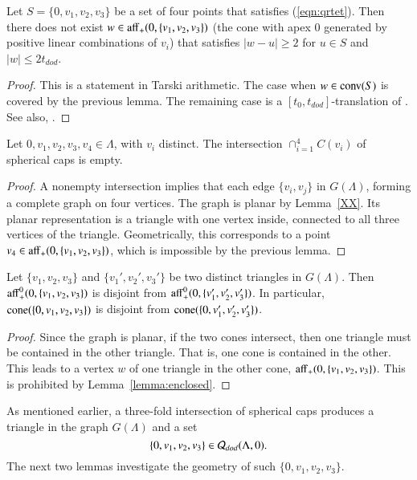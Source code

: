 \begin{lemma}\label{lemma:enclosed} 
Let $S=\{0,v_1,v_2,v_3\}$ be a set of four points
that satisfies (\ref{eqn:qrtet}).  Then
there does not exist $w\in{\operatorname{aff}}_+(0,\{v_1,v_2,v_3\})$
(the cone with apex $0$ 
generated by positive linear combinations of $v_i$) 
that satisfies $|w-u|\ge 2$ for 
$u\in S$ and $|w|\le 2t_{dod}$.
\end{lemma}

\begin{proof} This is a statement in Tarski arithmetic.
The case when $w\in{\operatorname{conv}}(S)$ is covered by the previous lemma.
The remaining case is a $[t_0,t_{dod}]$-translation of
\cite[Lemma~4.19]{DCG}.  See also,  \cite[Cor~3.7]{arx}.
\end{proof}

\begin{lemma}  Let $0,v_1,v_2,v_3,v_4\in\Lambda$, with
$v_i$ distinct.  The intersection $\cap_{i=1}^4 C(v_i)$
of spherical caps is empty.
\end{lemma}

\begin{proof}  A nonempty intersection implies that each
edge $\{v_i,v_j\}$ in  $G(\Lambda)$, forming a complete graph
on four vertices.  The graph is planar by Lemma~\ref{XX}.
Its planar representation is a triangle with one vertex inside,
connected to all three vertices of the triangle.
Geometrically, this corresponds to a point $v_4\in{\operatorname{aff}}_+(0,\{v_1,v_2,v_3\})$, which is impossible by the previous lemma.
\end{proof}

\begin{lemma}  Let $\{v_1,v_2,v_3\}$ and $\{v_1',v_2',v_3'\}$
be two distinct triangles in $G(\Lambda)$.  Then
${\operatorname{aff}}_+^0(0,\{v_1,v_2,v_3\})$ is disjoint from
${\operatorname{aff}}_+^0(0,\{v_1',v_2',v_3'\})$.  In particular,
${\operatorname{cone}}(\{0,v_1,v_2,v_3\})$ is disjoint from
${\operatorname{cone}}(\{0,v_1',v_2',v_3'\})$.
\end{lemma}

\begin{proof} Since the graph is planar, if the two cones
intersect, then one triangle must be contained in the other
triangle.  That is, one cone is contained in the other.  This
leads to a vertex $w$ of one triangle in the other
cone, ${\operatorname{aff}}_+(0,\{v_1,v_2,v_3\})$.  This is prohibited
by Lemma~\ref{lemma:enclosed}.
\end{proof}

As mentioned earlier, a three-fold intersection of spherical
caps produces a triangle in the graph $G(\Lambda)$ and a 
set 
$$\{0,v_1,v_2,v_3\}\in {\mathcal Q}_{dod}(\Lambda,0).$$
The next two lemmas investigate the geometry of such $\{0,v_1,v_2,v_3\}$.

